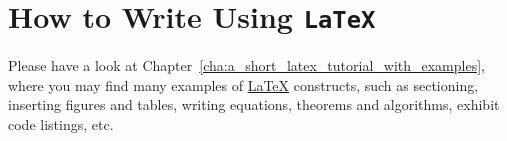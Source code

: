 	
\section{How to Write Using \texttt{LaTeX}} %
\label{sec:how_to_write_using_latex}

Please have a look at Chapter~\ref{cha:a_short_latex_tutorial_with_examples}, where you may find many examples of \href{http://tobi.oetiker.ch/lshort/lshort.pdf}{\LaTeX} constructs, such as sectioning, inserting figures and tables, writing equations, theorems and algorithms, exhibit code listings, etc.

